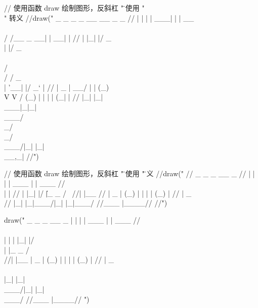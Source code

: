 // 使用函数 draw 绘制图形，反斜杠 "\" 请使用 "\\" 转义
//draw("  _   _      _ _    __        __         _     _ 
// | | | | ___| | | __\\ \\      / /__  _ __| | __| |
// | |_| |/ _ \\ | |/ _ \\ \\ /\\ / / _ \\| '__| |/ _` |
// |  _  |  __/ | | (_) \\ V  V / (_) | |  | | (_| |
// |_| |_|\\___|_|_|\\___/ \\_/\\_/ \\___/|_|  |_|\\__,_|
//")

// 使用函数 draw 绘制图形，反斜杠 "\" 请使用 "\" 转义
//draw("  
//  _   _       _             __   _
// | | | | ___ | |     ___  //  \\| |
// | |_| |/   \| |_ _ /   \     //| |__
// |  _  | (_) | | | | (_) |  //  |  _ \\
// |_| |_|\___/|_| |_|\___/ //___ |____//
//")


draw("    _   _       _             __   _
 | | | | ___ | |     ___  //  \\\\| |
 | |_| |/   \\| |_ _ /   \\     //| |__
 |  _  | (_) | | | | (_) |  //  |  _ \\\\
 |_| |_|\\___/|_| |_|\\___/ //___ |____//
")


